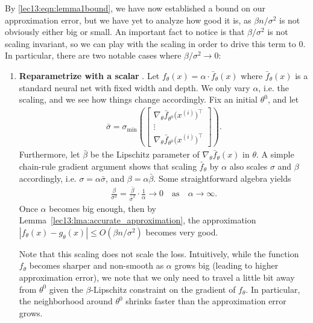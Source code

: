 By \eqref{lec13:eqn:lemma1bound}, we have now established a bound on our approximation error, but we have yet to analyze how good it is, as $\beta n /\sigma^2$ is not obviously either big or small. An important fact to notice is that $\beta/\sigma^2$ is not scaling invariant, so we can play with the scaling in order to drive this term to $0$. In particular, there are two notable cases where $\beta/\sigma^2 \to 0$: 
\begin{enumerate}
    \item  \textbf{Reparametrize with a scalar} \cite{chizat2018note}. Let $f_\theta(x) = \alpha \cdot \bar{f}_\theta(x)$ where $\bar{f}_\theta(x)$ is a standard neural net with fixed width and depth. We only vary $\alpha$, i.e. the scaling, and we see how things change accordingly. Fix an initial $\theta^0$, and let 
    \begin{align}
        \bar{\sigma} = \sigma_{\min}\left( \begin{bmatrix}  \nabla_\theta \bar{f}_{\theta^0} \big( x^{(i)} \big)^\top \\ \vdots \\ \nabla_\theta \bar{f}_{\theta^0} \big(x^{(i)} \big)^\top \end{bmatrix}\right).
    \end{align} 
    Furthermore, let $\bar{\beta}$ be the Lipschitz parameter of $\nabla_\theta \bar{f}_\theta(x)$ in $\theta$. A simple chain-rule gradient argument shows that scaling $\bar{f}_{\theta}$ by $\alpha$ also scales $\sigma$ and $\beta$ accordingly, i.e. $\sigma = \alpha \bar{\sigma}$, and $\beta = \alpha \bar{\beta}$. Some straightforward algebra yields 
    \begin{align} 
        \frac{\beta}{\sigma^2}= \frac{\bar{\beta}}{\bar{\sigma}^2} \cdot \frac{1}{\alpha} \to 0 \quad \text{as} \quad \alpha \to \infty.
    \end{align}
    Once $\alpha$ becomes big enough, then by Lemma~\ref{lec13:lma:accurate_approximation}, the approximation $|f_\theta(x) - g_\theta(x)| \leq O\left( \beta n / \sigma^2 \right)$ becomes very good.  
    \begin{remark}
    Note that this scaling does not scale the loss. Intuitively, while the function $f_\theta$ becomes sharper and non-smooth as $\alpha$ grows big (leading to higher approximation error), we note that we only need to travel a little bit away from $\theta^0$ given the $\beta$-Lipschitz constraint on the gradient of $f_{\theta}$. In particular, the neighborhood around $\theta^0$ shrinks faster than the approximation error grows.  

\end{remark}
\end{enumerate}
